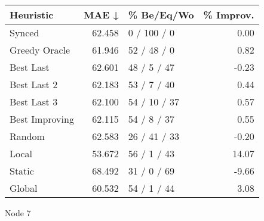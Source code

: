 \begin{tabular}{lrlr}
\toprule
\textbf{Heuristic} & \textbf{MAE ↓} & \textbf{\% Be/Eq/Wo} & \textbf{\% Improv.} \\
\midrule
            Synced &         62.458 &          0 / 100 / 0 &                0.00 \\
     Greedy Oracle &         61.946 &          52 / 48 / 0 &                0.82 \\
         Best Last &         62.601 &          48 / 5 / 47 &               -0.23 \\
       Best Last 2 &         62.183 &          53 / 7 / 40 &                0.44 \\
       Best Last 3 &         62.100 &         54 / 10 / 37 &                0.57 \\
    Best Improving &         62.115 &          54 / 8 / 37 &                0.55 \\
            Random &         62.583 &         26 / 41 / 33 &               -0.20 \\
             Local &         53.672 &          56 / 1 / 43 &               14.07 \\
            Static &         68.492 &          31 / 0 / 69 &               -9.66 \\
            Global &         60.532 &          54 / 1 / 44 &                3.08 \\
\bottomrule
\end{tabular}
\caption{Node 7}
\label{tab:non_lr01_le2_bs2_7}
